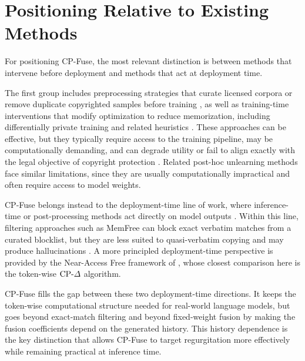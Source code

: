\section{Positioning Relative to Existing Methods}

For positioning CP-Fuse, the most relevant distinction is between methods that intervene before deployment and methods that act at deployment time.

The first group includes preprocessing strategies that curate licensed corpora or remove duplicate copyrighted samples before training \citep{kocetkov2022stack,min2023silo,ippolito2023donottrain,lee2021deduplicating,kandpal2022deduplicating,carlini2023quantifying}, as well as training-time interventions that modify optimization to reduce memorization, including differentially private training and related heuristics \citep{dwork2014algorithmic,abadi2016deep,anil2022large,zhang2023counterfactual,Somepalli2022DiffusionAO,mm_mem2024,hans2024like}. These approaches can be effective, but they typically require access to the training pipeline, may be computationally demanding, and can degrade utility or fail to align exactly with the legal objective of copyright protection \citep{ippolito2023preventing,Meeus2023DidTN,elkin2023can}. Related post-hoc unlearning methods \citep{bourtoule2021machine,chen2023unlearn,eldan2023s,jang2023knowledge,zhang2024negative,liu2024rethinking} face similar limitations, since they are usually computationally impractical and often require access to model weights.

CP-Fuse belongs instead to the deployment-time line of work, where inference-time or post-processing methods act directly on model outputs \citep{wei2024evaluating}. Within this line, filtering approaches such as MemFree \citep{ippolito2023preventing} can block exact verbatim matches from a curated blocklist, but they are less suited to quasi-verbatim copying and may produce hallucinations \citep{liu2024shield}. A more principled deployment-time perspective is provided by the Near-Access Free framework of \citet{vyas2023provable}, whose closest comparison here is the token-wise \(\text{CP-}\Delta\) algorithm.

CP-Fuse fills the gap between these two deployment-time directions. It keeps the token-wise computational structure needed for real-world language models, but goes beyond exact-match filtering and beyond fixed-weight fusion by making the fusion coefficients depend on the generated history. This history dependence is the key distinction that allows CP-Fuse to target regurgitation more effectively while remaining practical at inference time.

